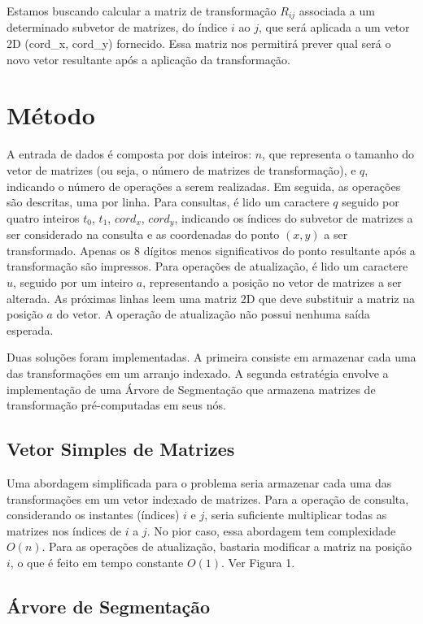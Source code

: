 \documentclass{article}
\begin{document}
Estamos buscando calcular a matriz de transformação  \(R_{ij}\)  associada a um determinado subvetor de matrizes, do índice \(i\) ao \(j\),  que será aplicada a um vetor 2D (cord\_x, cord\_y) fornecido. Essa matriz nos permitirá prever qual será o novo vetor resultante após a aplicação da transformação.


\section{Método}

A entrada de dados é composta por dois inteiros: $n$, que representa o tamanho do vetor de matrizes (ou seja, o número de matrizes de transformação), e $q$, indicando o número de operações a serem realizadas. Em seguida, as operações são descritas, uma por linha. Para consultas, é lido um caractere $q$ seguido por quatro inteiros $t_0$, $t_1$, $cord_x$, $cord_y$, indicando os índices do subvetor de matrizes a ser considerado na consulta e as coordenadas do ponto $(x, y)$ a ser transformado. Apenas os 8 dígitos menos significativos do ponto resultante após a transformação são impressos. Para operações de atualização, é lido um caractere $u$, seguido por um inteiro $a$, representando a posição no vetor de matrizes a ser alterada. As próximas linhas leem uma matriz 2D que deve substituir a matriz na posição $a$ do vetor. A operação de atualização não possui nenhuma saída esperada.

Duas soluções foram implementadas. A primeira consiste em armazenar cada uma das transformações em um arranjo indexado.  A segunda estratégia envolve a implementação de uma Árvore de Segmentação que armazena matrizes de transformação pré-computadas em seus nós.


\subsection{Vetor Simples de Matrizes}

Uma abordagem simplificada para o problema seria armazenar cada uma das transformações em um vetor indexado de matrizes. Para a operação de consulta, considerando os instantes (índices) $i$ e $j$, seria suficiente multiplicar todas as matrizes nos índices de $i$ a $j$. No pior caso, essa abordagem tem complexidade $O(n)$. Para as operações de atualização, bastaria modificar a matriz na posição $i$, o que é feito em tempo constante $O(1)$. Ver Figura 1.


\subsection{Árvore de Segmentação}
\end{document}
